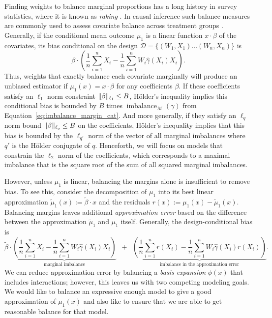 \documentclass{article}
\DeclarePairedDelimiter\norm{\lVert}{\rVert}
\theoremstyle{definition}
\DeclareMathOperator{\imbalance}{imbalance}
\newcommand{\hgamma}{\ensuremath{\hat\gamma}}
\newcommand{\model}{\mathcal{M}}
\newcommand{\<}{\langle}
\renewcommand{\>}{\rangle}
\begin{document}
Finding weights to balance marginal proportions has a long history in survey statistics, where it is known as \emph{raking} \citep[e.g.,][]{Deming1940, deville1992calibration}.
In causal inference such balance measures are commonly used to assess covariate balance across treatment groups \citep[e.g.,][]{cochran1965planning, rosenbaum1985constructing, rosenbaum2007minimum}. Generally, if the conditional mean outcome $\mu_1$ is a linear function $x \cdot \beta$ of the covariates, its bias conditional on the design $\mathcal{D} = \{ (W_1, X_1) \ldots (W_n,X_n) \}$ is
\begin{equation}
  \label{eq:bias_linear}
  \beta \cdot \left(\frac{1}{n}\sum_{i=1}^n X_i - \frac{1}{n}\sum_{i=1}^n W_i\hgamma(X_i) X_i\right).
\end{equation}
Thus, weights that exactly balance each covariate marginally will produce an unbiased estimator if $\mu_1(x)=x \cdot \beta$ for any coefficients $\beta$. If these coefficients satisfy an $\ell_1$ norm constraint $\norm{\beta}_{\ell_1} \le B$,
H\"older's inequality implies this conditional bias is bounded by $B$ times  $\imbalance_\model(\gamma)$ from Equation~\ref{eq:imbalance_margin_cat}. And more generally, if they satisfy an $\ell_q$ norm bound $\norm{\beta}_{\ell_q} \le B$ on the coefficients, H\"older's inequality implies that this bias is bounded by the $\ell_{q'}$ norm of the vector of all marginal imbalances where $q'$ is the H\"older conjugate of $q$. Henceforth, we will focus on models that constrain the $\ell_2$ norm of the coefficients, which corresponds to a maximal imbalance that is the square root of the sum of all squared marginal imbalances.





However, unless $\mu_1$ is linear, balancing the margins alone is insufficient to remove bias.
To see this, consider the decomposition of
$\mu_1$ into its best linear approximation $\tilde \mu_1(x) := \tilde\beta \cdot x$ and the residuals
$r(x) := \mu_1(x) - \tilde \mu_1(x)$.
Balancing margins leaves additional \emph{approximation error} based on the difference between the approximation $\tilde \mu_1$ and $\mu_1$ itself. Generally, the design-conditional bias is
\begin{equation}
  \label{eq:bias_basis}
  \tilde \beta \cdot \underbrace{\left(\frac{1}{n}\sum_{i=1}^n X_i - \frac{1}{n}\sum_{i=1}^n W_i\hgamma(X_i) X_i\right)}_{\text{marginal imbalance}} \;\;+\;\; \underbrace{\left(\frac{1}{n}\sum_{i=1}^n r(X_i) - \frac{1}{n}\sum_{i=1}^n W_i\hgamma(X_i) r(X_i)\right)}_{\text{imbalance in the approximation error}}.
\end{equation}
We can reduce approximation error by balancing a \emph{basis expansion} $\phi(x)$ that includes interactions; however, this leaves us with two competing modeling goals.
We would like to balance an expressive enough model to give a good approximation of $\mu_1(x)$ and also like to ensure that we are able to get reasonable balance for that model.
\end{document}
